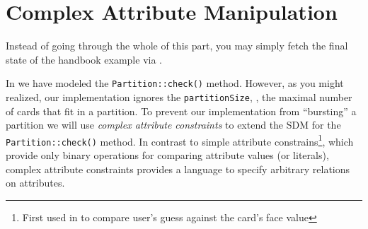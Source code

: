 \newpage
\chapter{Complex Attribute Manipulation}
\genHeader

Instead of going through the whole of this part, you may simply fetch the final state of the handbook example via .

In  we have modeled the \texttt{Partition::check()} method.
However, as you might realized, our implementation ignores the \texttt{partitionSize}, \idest, the maximal number of cards that fit in a partition.
To prevent our implementation from \enquote{bursting} a partition we will use \emph{complex attribute constraints} to extend the SDM for the \texttt{Partition::check()} method. 
In contrast to simple attribute constrains\footnote{First used in  to compare user’s guess against the card's face value}, which provide only binary operations for comparing attribute values (or literals), complex attribute constraints provides a language to specify arbitrary relations on attributes.

